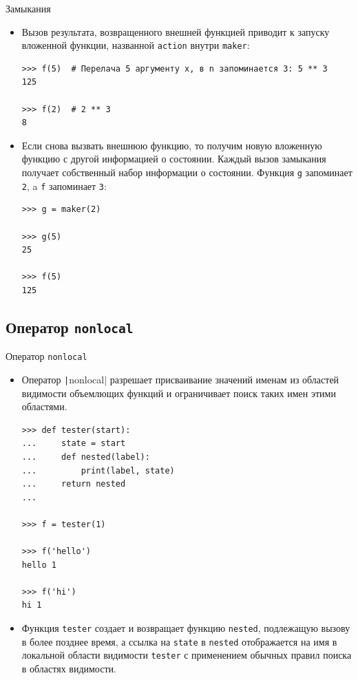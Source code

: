 \documentclass[aspectratio=169]{beamer}%
\begin{document}
\begin{frame}[fragile]{Замыкания}
\scriptsize
\begin{itemize}
\item Вызов результата, возвращенного внешней функцией  приводит к запуску вложенной функции, названной \texttt{action} внутри \texttt{maker}:

\begin{verbatim}
>>> f(5)  # Перелача 5 аргументу x, в n запоминается 3: 5 ** 3
125

>>> f(2)  # 2 ** 3
8
\end{verbatim}

\item Если снова вызвать внешнюю функцию, то получим новую вложенную функцию с другой информацией о состоянии. Каждый вызов замыкания получает собственный набор информации о состоянии.  Функция \texttt{g} запоминает \texttt{2}, a \texttt{f} запоминает \texttt{3}:

\begin{verbatim}
>>> g = maker(2)

>>> g(5)
25

>>> f(5)
125
\end{verbatim}

\end{itemize}
\vfill
\end{frame}


\subsection{Оператор \texttt{nonlocal}}
\begin{frame}[fragile]{Оператор \texttt{nonlocal}}
\scriptsize
\begin{itemize}
\item Оператор \texttt|nonlocal| разрешает присваивание значений именам из областей видимости объемлющих функций и ограничивает поиск таких имен этими областями. 

\begin{verbatim}
>>> def tester(start):
...     state = start
...     def nested(label):
...         print(label, state)
...     return nested
...

>>> f = tester(1)

>>> f('hello')
hello 1

>>> f('hi')
hi 1
\end{verbatim}
\item Функция \texttt{tester} создает и возвращает функцию \texttt{nested}, подлежащую вызову в более позднее время, а ссылка на \texttt{state} в \texttt{nested} отображается на имя в локальной области видимости \texttt{tester} с применением обычных правил поиска в областях видимости.

\end{itemize}
\vfill
\end{frame}
\end{document}
